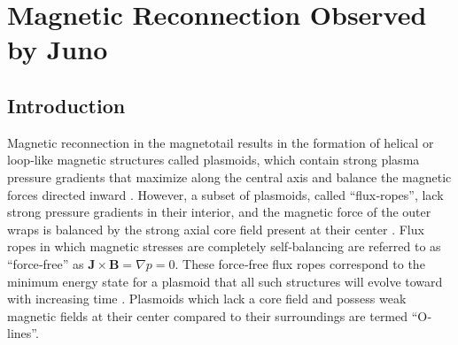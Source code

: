 \chapter{Magnetic Reconnection Observed by Juno}



\section{Introduction}
Magnetic reconnection in the magnetotail results in the formation of helical or loop‐like magnetic structures called plasmoids, which contain strong plasma pressure gradients that maximize along the central axis and balance the magnetic forces directed inward \cite{Hones1984StructureActivity, Kivelson1995ModelsPlasmas, Slavin1989CDAWAssessment}. However, a subset of plasmoids, called ``flux‐ropes'', lack strong pressure gradients in their interior, and the magnetic force of the outer wraps is balanced by the strong axial core field present at their center \cite{Moldwin1991PlasmoidsRopes,Sibeck1984MagnetotailRopes}. Flux ropes in which magnetic stresses are completely self‐balancing are referred to as “force‐free” as $\mathbf{J}\times\mathbf{B}=\nabla p = 0$. These force‐free flux ropes correspond to the minimum energy state for a plasmoid that all such structures will evolve toward with increasing time \cite{Priest2013TheLecture,Taylor1974RelaxationFields}. Plasmoids which lack a core field and possess weak magnetic fields at their center compared to their surroundings are termed ``O‐lines''.

